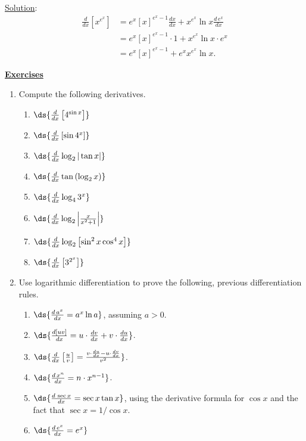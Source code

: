 \underline{Solution}:
\begin{align*}
\frac{d}{dx}\left[x^{e^x}\right]
&=e^x[x]^{e^x-1}\frac{dx}{dx}+x^{e^x}\ln x\frac{d\,e^x}{dx}\\
&=e^x[x]^{e^x-1}\cdot1+x^{e^x}\ln x\cdot e^x\\
&=e^x[x]^{e^{x}-1}+e^xx^{e^x}\ln x.
\end{align*}



\eex
\newpage
\begin{center}\underline{\Large{\bf Exercises}}\end{center}
\bigskip
\begin{multicols}{2}
\begin{enumerate}
\item Compute the following derivatives.
  \begin{enumerate}
  \item $\ds{\frac{d}{dx}\left[4^{\sin x}\right]}$
  \item $\ds{\frac{d}{dx}\left[\sin4^x\right]}$
  \item $\ds{\frac{d}{dx}\log_2|\tan x|}$
  \item $\ds{\frac{d}{dx}\tan\left(\log_2x\right)}$
  \item $\ds{\frac{d}{dx}\log_43^x}$
  \item $\ds{\frac{d}{dx}\log_2\left|\frac{x}{x^2+1}\right|}$
  \item $\ds{\frac{d}{dx}\log_2\left[\sin^2x\cos^4x\right]}$
  \item $\ds{\frac{d}{dx}\left[3^{2^x}\right]}$
  \end{enumerate}
\item Use logarithmic differentiation
  to prove the following,  previous differentiation rules.
  \begin{enumerate}
  \item  $\ds{\frac{d\,a^x}{dx}=a^x\ln a}$,
      assuming $a>0$.
  \item $\ds{\frac{d[uv]}{dx}=u\cdot\frac{dv}{dx}
                                  +v\cdot\frac{du}{dx}}$.
  \item $\ds{\frac{d}{dx}\left[\frac{u}v\right]
           =\frac{v\cdot\frac{du}{dx}-u\cdot\frac{dv}{dx}}{v^2}}$.
  \item $\ds{\frac{d\,x^n}{dx}=n\cdot x^{n-1}}$.
  \item $\ds{\frac{d\,\sec x}{dx}=\sec x\tan x}$, using the derivative
        formula for $\cos x$ and the fact that $\sec x=1/\cos x$.
  \item $\ds{\frac{d\,e^x}{dx}=e^x}$

\end{enumerate}
\end{enumerate}
\end{multicols}
